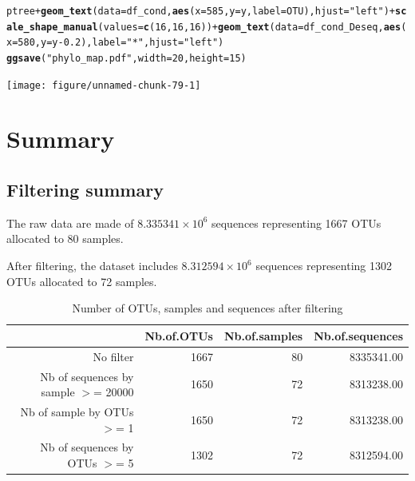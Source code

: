 \documentclass[12pt]{article}\usepackage[]{graphicx}\usepackage[]{color}
\makeatletter
\newcommand{\hlnum}[1]{\textcolor[rgb]{0.686,0.059,0.569}{#1}}%
\newcommand{\hlstr}[1]{\textcolor[rgb]{0.192,0.494,0.8}{#1}}%
\newcommand{\hlopt}[1]{\textcolor[rgb]{0,0,0}{#1}}%
\newcommand{\hlstd}[1]{\textcolor[rgb]{0.345,0.345,0.345}{#1}}%
\newcommand{\hlkwc}[1]{\textcolor[rgb]{0.333,0.667,0.333}{#1}}%
\newcommand{\hlkwd}[1]{\textcolor[rgb]{0.737,0.353,0.396}{\textbf{#1}}}%
\newenvironment{kframe}{%
 \def\at@end@of@kframe{}%
 \ifinner\ifhmode%
  \def\at@end@of@kframe{\end{minipage}}%
  \begin{minipage}{\columnwidth}%
 \fi\fi%
 \def\FrameCommand##1{\hskip\@totalleftmargin \hskip-\fboxsep
 \colorbox{shadecolor}{##1}\hskip-\fboxsep
     \hskip-\linewidth \hskip-\@totalleftmargin \hskip\columnwidth}%
 \MakeFramed {\advance\hsize-\width
   \@totalleftmargin\z@ \linewidth\hsize
   \@setminipage}}%
 {\par\unskip\endMakeFramed%
 \at@end@of@kframe}
\newenvironment{knitrout}{}{} %
\numberwithin{figure}{section}
\makeatother
\begin{document}
\begin{knitrout}\small
{}\color{fgcolor}\begin{kframe}
\begin{alltt}
\hlstd{ptree} \hlopt{+} \hlkwd{geom_text}\hlstd{(}\hlkwc{data} \hlstd{= df_cond,} \hlkwd{aes}\hlstd{(}\hlkwc{x} \hlstd{=} \hlnum{585}\hlstd{,} \hlkwc{y} \hlstd{= y,} \hlkwc{label} \hlstd{= OTU),} \hlkwc{hjust} \hlstd{=} \hlstr{"left"}\hlstd{)} \hlopt{+} \hlkwd{scale_shape_manual}\hlstd{(}\hlkwc{values} \hlstd{=} \hlkwd{c}\hlstd{(}\hlnum{16}\hlstd{,} \hlnum{16}\hlstd{,} \hlnum{16}\hlstd{))} \hlopt{+} \hlkwd{geom_text}\hlstd{(}\hlkwc{data} \hlstd{= df_cond_Deseq,} \hlkwd{aes}\hlstd{(}\hlkwc{x} \hlstd{=} \hlnum{580}\hlstd{,} \hlkwc{y} \hlstd{= y}\hlopt{-}\hlnum{0.2}\hlstd{),} \hlkwc{label} \hlstd{=} \hlstr{"*"}\hlstd{,} \hlkwc{hjust} \hlstd{=} \hlstr{"left"}\hlstd{)}
\hlkwd{ggsave}\hlstd{(}\hlstr{"phylo_map.pdf"}\hlstd{,}  \hlkwc{width} \hlstd{=} \hlnum{20}\hlstd{,} \hlkwc{height} \hlstd{=} \hlnum{15}\hlstd{)}
\end{alltt}
\end{kframe}

{\centering \texttt{[image: figure/unnamed-chunk-79-1]} 

}



\end{knitrout}



\section{Summary}
\label{sect:summary}

  \subsection{Filtering summary}

The raw data are made of \ensuremath{8.335341\times 10^{6}} sequences representing 1667 OTUs allocated to 80 samples.

After filtering, the dataset includes \ensuremath{8.312594\times 10^{6}} sequences representing 1302 OTUs allocated to 72 samples.

\begin{table}[ht]
\centering
\begin{tabular}{rrrr}
  \hline
 & Nb.of.OTUs & Nb.of.samples & Nb.of.sequences \\ 
  \hline
No filter & 1667 &  80 & 8335341.00 \\ 
  Nb of sequences by sample $>$=  20000 & 1650 &  72 & 8313238.00 \\ 
  Nb of sample by OTUs $>$=  1 & 1650 &  72 & 8313238.00 \\ 
  Nb of sequences by OTUs $>$=  5 & 1302 &  72 & 8312594.00 \\ 
   \hline
\end{tabular}
\caption{Number of OTUs, samples and sequences after filtering} 
\end{table}
\end{document}
